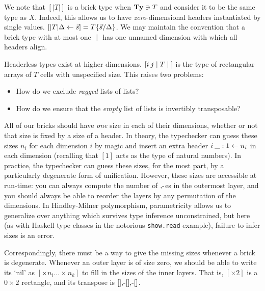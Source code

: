 \documentclass{article}
\begin{document}
We note that $[|T|]$ is a brick type when $\mathbf{Ty}\ni T$ and consider it to be the same type as $X$. Indeed, this allows us to have \emph{zero}-dimensional headers instantiated by single values. $[|T|\Delta\leftarrow\vec s] = T\{\vec s/\Delta\}$. We may maintain the convention that a brick type with at most one $\;|\;$ has one unnamed dimension with which all headers align.

Headerless types exist at higher dimensions. $[i\: j\;|\; T \;|\;]$ is the type of rectangular arrays of $T$ cells with unspecified size. This raises two problems:
\begin{itemize}
\item How do we exclude \emph{ragged} lists of lists?
\item How do we ensure that the \emph{empty} list of lists is invertibly transposable?
\end{itemize}

All of our bricks should have \emph{one} size in each of their dimensions, whether or not that size is fixed by a size of a header. In theory, the typechecker can guess these sizes $n_i$ for each dimension $i$ by magic and insert an extra header $i\:\_:1\leftarrow n_i$ in each dimension (recalling that $[1]$ acts as the type of natural numbers). In practice, the typechecker can guess these sizes, for the most part, by a particularly degenerate form of unification. However, these sizes are accessible at run-time: you can always compute the number of $\mbox{$,\!\textrm{-}$}$es in the outermost layer, and you should always be able to reorder the layers by any permutation of the dimensions. In Hindley-Milner polymorphism, parametricity allows us to generalize over anything which survives type inference unconstrained, but here (as with Haskell type classes in the notorious \texttt{show.read} example), failure to infer sizes is an error.

Correspondingly, there must be a way to give the missing sizes whenever a brick is degenerate. Whenever an outer layer is of size zero, we should be able to write its `nil' as $[\times n_i\ldots\times n_k]$ to fill in the sizes of the inner layers. That is, $[\times 2]$ is a $0\times 2$ rectangle, and its transpose is $[]\mbox{$,\!\textrm{-}$}[]\mbox{$,\!\textrm{-}$}[]$.
\end{document}
